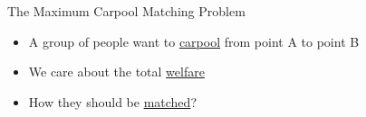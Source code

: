 \begin{frame}{The Maximum Carpool Matching Problem}
\begin{itemize}
	\item<1> A group of people want to \underline{carpool} from point A to point B
	\item<2> We care about the total \underline{welfare}
	\item<3> How they should be \underline{matched}?
\end{itemize}

\centering


\end{frame}
